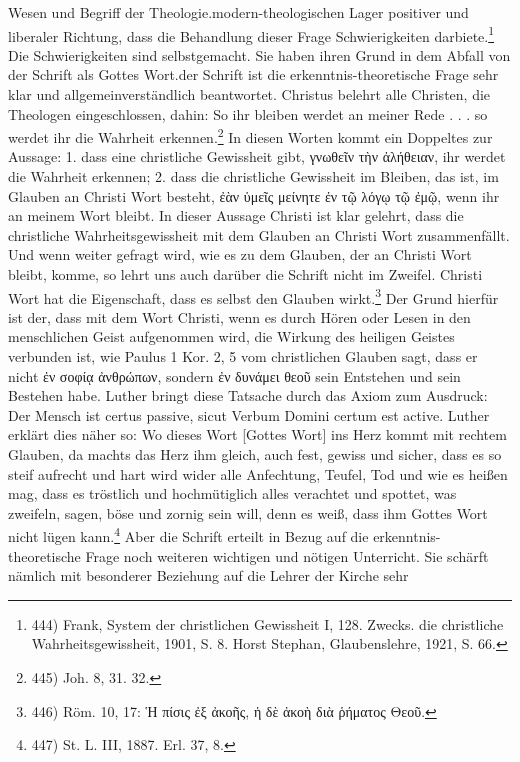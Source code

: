  \hfill Wesen und Begriff der Theologie.\n\ndem modern-theologischen Lager \„positiver\“ und \„liberaler\“ Richtung, dass die Behandlung dieser Frage Schwierigkeiten darbiete.\footnote{444) Frank, System der christlichen Gewissheit I, 128. Zwecks. die christliche Wahrheitsgewissheit, 1901, S. 8. Horst Stephan, Glaubenslehre, 1921, S. 66.} Die Schwierigkeiten sind selbstgemacht. Sie haben ihren Grund in dem Abfall von der Schrift als Gottes Wort.\n\nIn der Schrift ist die \„erkenntnis-theoretische Frage\“ sehr klar und allgemeinverständlich beantwortet. Christus belehrt alle Christen, die Theologen eingeschlossen, dahin: \„So ihr bleiben werdet an meiner Rede . . . so werdet ihr die Wahrheit erkennen.\“\footnote{445) Joh. 8, 31. 32.} In diesen Worten kommt ein Doppeltes zur Aussage: 1. dass eine christliche Gewissheit gibt, \textgreek{γνωθεῖν τὴν ἀλήθειαν}, ihr werdet die Wahrheit erkennen; 2. dass die christliche Gewissheit im Bleiben, das ist, im Glauben an Christi Wort besteht, \textgreek{ἐὰν ὑμεῖς μείνητε ἐν τῷ λόγῳ τῷ ἐμῷ}, wenn ihr an meinem Wort bleibt. In dieser Aussage Christi ist klar gelehrt, dass die christliche \„Wahrheitsgewissheit\“ mit dem Glauben an Christi Wort zusammenfällt. Und wenn weiter gefragt wird, wie es zu dem Glauben, der an Christi Wort bleibt, komme, so lehrt uns auch darüber die Schrift nicht im Zweifel. Christi Wort hat die Eigenschaft, dass es selbst den Glauben wirkt.\footnote{446) Röm. 10, 17: \„\textgreek{Ἡ πίσις ἐξ ἀκοῆς}, \textgreek{ἡ δὲ ἀκοὴ διὰ ῥήματος Θεοῦ}.\“} Der Grund hierfür ist der, dass mit dem Wort Christi, wenn es durch Hören oder Lesen in den menschlichen Geist aufgenommen wird, die Wirkung des heiligen Geistes verbunden ist, wie Paulus 1 Kor. 2, 5 vom christlichen Glauben sagt, dass er nicht \textgreek{ἐν σοφίᾳ ἀνθρώπων}, sondern \textgreek{ἐν δυνάμει θεοῦ} sein Entstehen und sein Bestehen habe. Luther bringt diese Tatsache durch das Axiom zum Ausdruck: Der Mensch ist certus passive, sicut Verbum Domini certum est active. Luther erklärt dies näher so: \„Wo dieses Wort [Gottes Wort] ins Herz kommt mit rechtem Glauben, da macht\textquotesingle{}s das Herz ihm gleich, auch fest, gewiss und sicher, dass es so steif aufrecht und hart wird wider alle Anfechtung, Teufel, Tod und wie es heißen mag, dass es tröstlich und hochmütiglich alles verachtet und spottet, was zweifeln, sagen, böse und zornig sein will, denn es weiß, dass ihm Gottes Wort nicht lügen kann.\“\footnote{447) St. L. III, 1887. Erl. 37, 8.} Aber die Schrift erteilt in Bezug auf die \„erkenntnis-theoretische Frage\“ noch weiteren wichtigen und nötigen Unterricht. Sie schärft nämlich mit besonderer Beziehung auf die Lehrer der Kirche sehr